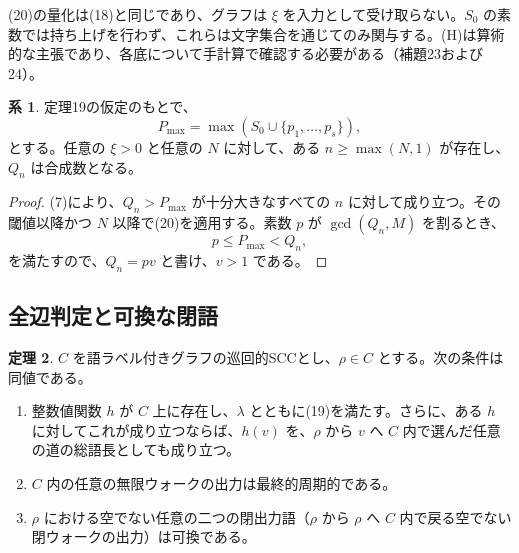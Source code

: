 \documentclass[11pt,reqno]{amsart}
\theoremstyle{definition}
\newtheorem{theorem}{定理}
\newtheorem{corollary}[theorem]{系}
\theoremstyle{definition}
\theoremstyle{remark}
\begin{document}
(20)の量化は(18)と同じであり、グラフは \(\xi\) を入力として受け取らない。\(S_0\) の素数では持ち上げを行わず、これらは文字集合を通じてのみ関与する。(H)は算術的な主張であり、各底について手計算で確認する必要がある（補題23および24）。

\begin{samepage}
\begin{corollary}\leavevmode\label{thm:20}
定理19の仮定のもとで、
\[
P_{\max}=\max(S_0\cup\{p_1,\ldots,p_s\}),
\]
とする。任意の \(\xi>0\) と任意の \(N\) に対して、ある \(n\ge\max(N,1)\) が存在し、\(Q_n\) は合成数となる。
\label{thm-end:20}
\end{corollary}
\end{samepage}

\begin{proof}\leavevmode\label{proof:20}
(7)により、\(Q_n>P_{\max}\) が十分大きなすべての \(n\) に対して成り立つ。その閾値以降かつ \(N\) 以降で(20)を適用する。素数 \(p\) が \(\gcd(Q_n,M)\) を割るとき、
\[
p\le P_{\max}<Q_n,
\]
を満たすので、\(Q_n=pv\) と書け、\(v>1\) である。\qedhere
\end{proof}

\subsection{全辺判定と可換な閉語}\label{sec:4.6}

\begin{samepage}
\begin{theorem}\leavevmode\label{thm:21}
\(C\) を語ラベル付きグラフの巡回的SCCとし、\(\rho\in C\) とする。次の条件は同値である。

\begin{enumerate}
\def\labelenumi{(\alph{enumi})}
\item
  整数値関数 \(h\) が \(C\) 上に存在し、\(\lambda\) とともに(19)を満たす。さらに、ある \(h\) に対してこれが成り立つならば、\(h(v)\) を、\(\rho\) から \(v\) へ \(C\) 内で選んだ任意の道の総語長としても成り立つ。
\item
  \(C\) 内の任意の無限ウォークの出力は最終的周期的である。
\item
  \(\rho\) における空でない任意の二つの閉出力語（\(\rho\) から \(\rho\) へ \(C\) 内で戻る空でない閉ウォークの出力）は可換である。
\end{enumerate}
\label{thm-end:21}
\end{theorem}
\end{samepage}
\end{document}
